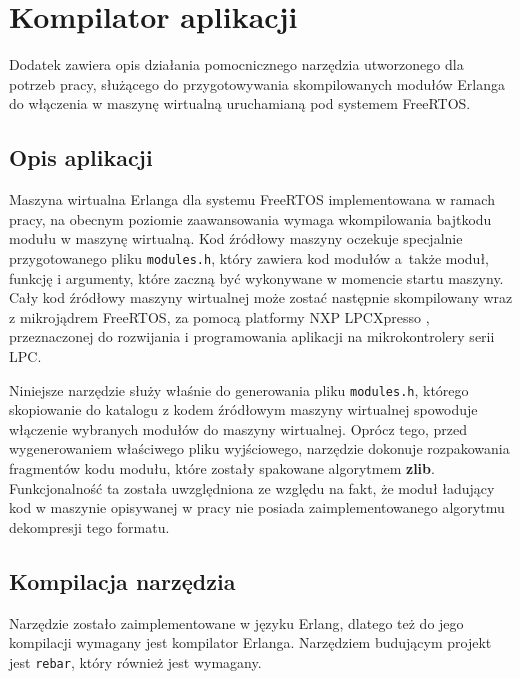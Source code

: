 \chapter{Kompilator aplikacji}
\label{cha:builder}

Dodatek zawiera opis działania pomocnicznego narzędzia utworzonego dla potrzeb pracy, służącego do przygotowywania skompilowanych modułów Erlanga do włączenia w maszynę wirtualną uruchamianą pod systemem FreeRTOS.


\section{Opis aplikacji}
\label{sec:builderOpis}
Maszyna wirtualna Erlanga dla systemu FreeRTOS implementowana w ramach pracy, na obecnym poziomie zaawansowania wymaga wkompilowania bajtkodu modułu w maszynę wirtualną.
Kod źródłowy maszyny oczekuje specjalnie przygotowanego pliku \texttt{modules.h}, który zawiera kod modułów a~także moduł, funkcję i argumenty, które zaczną być wykonywane w momencie startu maszyny.
Cały kod źródłowy maszyny wirtualnej może zostać następnie skompilowany wraz z mikrojądrem FreeRTOS, za pomocą platformy NXP LPCXpresso \cite{LPCXpresso}, przeznaczonej do rozwijania i programowania aplikacji na mikrokontrolery serii LPC.

Niniejsze narzędzie służy właśnie do generowania pliku \texttt{modules.h}, którego skopiowanie do katalogu z kodem źródłowym maszyny wirtualnej spowoduje włączenie wybranych modułów do maszyny wirtualnej.
Oprócz tego, przed wygenerowaniem właściwego pliku wyjściowego, narzędzie dokonuje rozpakowania fragmentów kodu modułu, które zostały spakowane algorytmem \textbf{zlib}.
Funkcjonalność ta została uwzględniona ze względu na fakt, że moduł ładujący kod w maszynie opisywanej w pracy nie posiada zaimplementowanego algorytmu dekompresji tego formatu.

\section{Kompilacja narzędzia}
\label{sec:builderKompilacja}

Narzędzie zostało zaimplementowane w języku Erlang, dlatego też do jego kompilacji wymagany jest kompilator Erlanga. Narzędziem budującym projekt jest \texttt{rebar}, który również jest wymagany.

